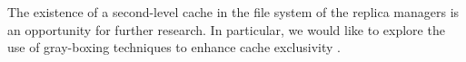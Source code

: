 The existence of a second-level cache in the file system of the replica managers is an opportunity for further research. In particular, we would like to explore the use of gray-boxing techniques to enhance cache exclusivity \cite{bairavasundaram2004x}.
